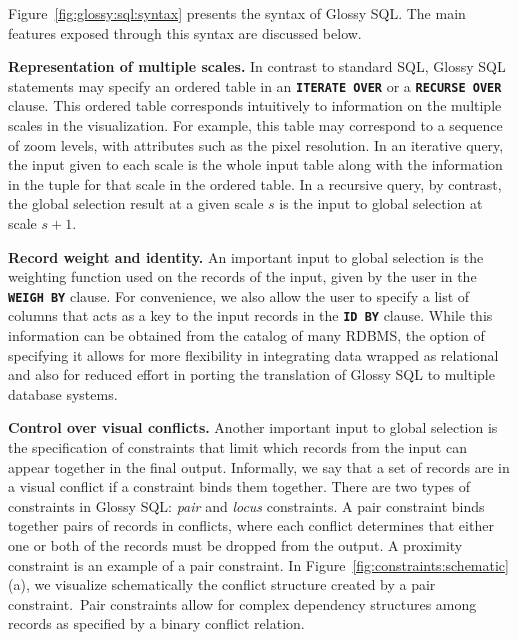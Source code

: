 \documentclass[11pt, oneside]{report}
\newcommand{\minisec}[1]{\noindent\textbf{#1.}}
\begin{document}
Figure~\ref{fig:glossy:sql:syntax} presents the syntax of Glossy SQL. The main features exposed through this syntax are discussed below. 

 \minisec{Representation of multiple scales} 
In contrast to standard SQL, Glossy SQL statements may specify an ordered table in an \textbf{\texttt{ITERATE OVER}} or a \textbf{\texttt{RECURSE OVER}} clause. This ordered table corresponds intuitively to information on the multiple scales in the visualization. For example, this table may correspond to a sequence of zoom levels, with attributes such as the pixel resolution. In an iterative query, the input given to each scale is the whole input table along with the information in the tuple for that scale in the ordered table. In a recursive query, by contrast, the global selection result at a given scale $s$ is the input to global selection at scale $s+1$.  

\minisec{Record weight and identity}
An important input to global selection is the weighting function used on the records of the input, given by the user in the \textbf{\texttt{WEIGH BY}} clause. For convenience, we also allow the user to specify a list of columns that acts as a key to the input records in the \textbf{\texttt{ID BY}} clause. While this information can be obtained from the catalog of many RDBMS, the option of specifying it allows for more flexibility in integrating data wrapped as relational and also for reduced effort in porting the translation of Glossy SQL to multiple database systems. 

\minisec{Control over visual conflicts}
Another important input to global selection is the specification of constraints that limit which records from the input can appear together in the final output. Informally, we say that a set of records are in a visual conflict if a constraint binds them together. There are two types of constraints in Glossy SQL: \emph{pair} and \emph{locus} constraints. A pair constraint binds together pairs of records in conflicts, where each conflict determines that either one or both of the records must be dropped from the output. A proximity constraint is an example of a pair constraint. In Figure~\ref{fig:constraints:schematic}(a), we visualize schematically the conflict structure created by a pair constraint.~Pair constraints allow for complex dependency structures among records as specified by a binary conflict relation.  
\end{document}

